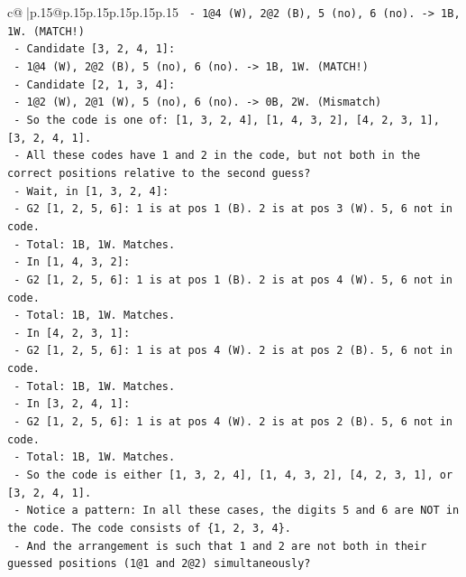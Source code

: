 \documentclass{article}
\begin{document}
{\begin{supertabular}{c@{$\;$}|p{.15\linewidth}@{}p{.15\linewidth}p{.15\linewidth}p{.15\linewidth}p{.15\linewidth}p{.15\linewidth}}
{{{\texttt{              {-} 1@4 (W), 2@2 (B), 5 (no), 6 (no). {-}> 1B, 1W. (MATCH!)} \\
\texttt{            {-} Candidate {[}3, 2, 4, 1{]}:} \\
\texttt{              {-} 1@4 (W), 2@2 (B), 5 (no), 6 (no). {-}> 1B, 1W. (MATCH!)} \\
\texttt{            {-} Candidate {[}2, 1, 3, 4{]}:} \\
\texttt{              {-} 1@2 (W), 2@1 (W), 5 (no), 6 (no). {-}> 0B, 2W. (Mismatch)} \\
\texttt{          {-} So the code is one of: {[}1, 3, 2, 4{]}, {[}1, 4, 3, 2{]}, {[}4, 2, 3, 1{]}, {[}3, 2, 4, 1{]}.} \\
\texttt{          {-} All these codes have 1 and 2 in the code, but not both in the correct positions relative to the second guess?} \\
\texttt{          {-} Wait, in {[}1, 3, 2, 4{]}:} \\
\texttt{            {-} G2 {[}1, 2, 5, 6{]}: 1 is at pos 1 (B). 2 is at pos 3 (W). 5, 6 not in code.} \\
\texttt{            {-} Total: 1B, 1W. Matches.} \\
\texttt{          {-} In {[}1, 4, 3, 2{]}:} \\
\texttt{            {-} G2 {[}1, 2, 5, 6{]}: 1 is at pos 1 (B). 2 is at pos 4 (W). 5, 6 not in code.} \\
\texttt{            {-} Total: 1B, 1W. Matches.} \\
\texttt{          {-} In {[}4, 2, 3, 1{]}:} \\
\texttt{            {-} G2 {[}1, 2, 5, 6{]}: 1 is at pos 4 (W). 2 is at pos 2 (B). 5, 6 not in code.} \\
\texttt{            {-} Total: 1B, 1W. Matches.} \\
\texttt{          {-} In {[}3, 2, 4, 1{]}:} \\
\texttt{            {-} G2 {[}1, 2, 5, 6{]}: 1 is at pos 4 (W). 2 is at pos 2 (B). 5, 6 not in code.} \\
\texttt{            {-} Total: 1B, 1W. Matches.} \\
\texttt{          {-} So the code is either {[}1, 3, 2, 4{]}, {[}1, 4, 3, 2{]}, {[}4, 2, 3, 1{]}, or {[}3, 2, 4, 1{]}.} \\
\texttt{          {-} Notice a pattern: In all these cases, the digits 5 and 6 are NOT in the code. The code consists of \{1, 2, 3, 4\}.} \\
\texttt{          {-} And the arrangement is such that 1 and 2 are not both in their guessed positions (1@1 and 2@2) simultaneously?} \\
}}}
\end{supertabular}}
\end{document}
